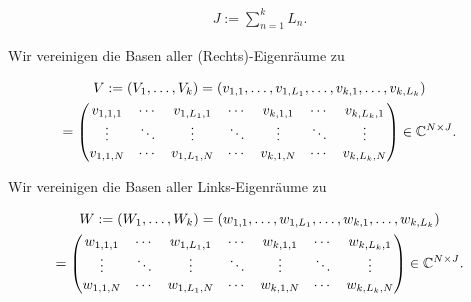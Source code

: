\begin{align*}
    J
    :=
    \sum_{n=1}^k
        L_n.
\end{align*}

\begin{comment}

    Für lineare Eigenwertprobleme würde weiters gelten

    \begin{align*}
        J
        \stackrel{!}{=}
        \sum_{n=1}^k
            \Def(A - \lambda_n I_N)
        =
        \dim
        \bigoplus_{n=1}^k
            \ker (A - \lambda_n I_N)
        \ll
        \dim \C^N
        =
        N.
    \end{align*}

\end{comment}

Wir vereinigen die Basen aller (Rechts)-Eigenräume zu

\begin{multline*}
    V
    :=
    (V_1, \dots, V_k)
    =
    (v_{1, 1}, \dots, v_{1, L_1}, \dots, v_{k, 1}, \dots, v_{k, L_k}) \\
    =
    \begin{pmatrix}
        v_{1, 1, 1} & \cdots & v_{1, L_1, 1} & \cdots & v_{k, 1, 1} & \cdots & v_{k, L_k, 1} \\
        \vdots      & \ddots & \vdots        & \ddots & \vdots      & \ddots & \vdots        \\
        v_{1, 1, N} & \cdots & v_{1, L_1, N} & \cdots & v_{k, 1, N} & \cdots & v_{k, L_k, N}
    \end{pmatrix}
    \in
    \mathbb C^{N \times J}.
\end{multline*}

Wir vereinigen die Basen aller Links-Eigenräume zu

\begin{multline*}
    W
    :=
    (W_1, \dots, W_k)
    =
    (w_{1, 1}, \dots, w_{1, L_1}, \dots, w_{k, 1}, \dots, w_{k, L_k}) \\
    =
    \begin{pmatrix}
        w_{1, 1, 1} & \cdots & w_{1, L_1, 1} & \cdots & w_{k, 1, 1} & \cdots & w_{k, L_k, 1} \\
        \vdots      & \ddots & \vdots        & \ddots & \vdots      & \ddots & \vdots        \\
        w_{1, 1, N} & \cdots & w_{1, L_1, N} & \cdots & w_{k, 1, N} & \cdots & w_{k, L_k, N}
    \end{pmatrix}
    \in
    \mathbb C^{N \times J}.
\end{multline*}

